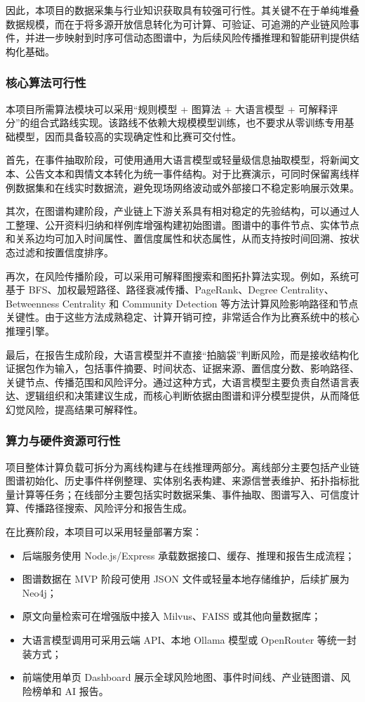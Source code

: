 \documentclass[12pt,a4paper]{article}
\begin{document}
因此，本项目的数据采集与行业知识获取具有较强可行性。其关键不在于单纯堆叠数据规模，而在于将多源开放信息转化为可计算、可验证、可追溯的产业链风险事件，并进一步映射到时序可信动态图谱中，为后续风险传播推理和智能研判提供结构化基础。

\subsubsection{核心算法可行性}

本项目所需算法模块可以采用“规则模型 + 图算法 + 大语言模型 + 可解释评分”的组合式路线实现。该路线不依赖大规模模型训练，也不要求从零训练专用基础模型，因而具备较高的实现确定性和比赛可交付性。

首先，在事件抽取阶段，可使用通用大语言模型或轻量级信息抽取模型，将新闻文本、公告文本和舆情文本转化为统一事件结构。对于比赛演示，可同时保留离线样例数据集和在线实时数据流，避免现场网络波动或外部接口不稳定影响展示效果。

其次，在图谱构建阶段，产业链上下游关系具有相对稳定的先验结构，可以通过人工整理、公开资料归纳和样例库增强构建初始图谱。图谱中的事件节点、实体节点和关系边均可加入时间属性、置信度属性和状态属性，从而支持按时间回溯、按状态过滤和按置信度排序。

再次，在风险传播阶段，可以采用可解释图搜索和图拓扑算法实现。例如，系统可基于 BFS、加权最短路径、路径衰减传播、PageRank、Degree Centrality、Betweenness Centrality 和 Community Detection 等方法计算风险影响路径和节点关键性。由于这些方法成熟稳定、计算开销可控，非常适合作为比赛系统中的核心推理引擎。

最后，在报告生成阶段，大语言模型并不直接“拍脑袋”判断风险，而是接收结构化证据包作为输入，包括事件摘要、时间状态、证据来源、置信度分数、影响路径、关键节点、传播范围和风险评分。通过这种方式，大语言模型主要负责自然语言表达、逻辑组织和决策建议生成，而核心判断依据由图谱和评分模型提供，从而降低幻觉风险，提高结果可解释性。

\subsubsection{算力与硬件资源可行性}

项目整体计算负载可拆分为离线构建与在线推理两部分。离线部分主要包括产业链图谱初始化、历史事件样例整理、实体别名表构建、来源信誉表维护、拓扑指标批量计算等任务；在线部分主要包括实时数据采集、事件抽取、图谱写入、可信度计算、传播路径搜索、风险评分和报告生成。

在比赛阶段，本项目可以采用轻量部署方案：
\begin{itemize}
    \item 后端服务使用 Node.js/Express 承载数据接口、缓存、推理和报告生成流程；
    \item 图谱数据在 MVP 阶段可使用 JSON 文件或轻量本地存储维护，后续扩展为 Neo4j；
    \item 原文向量检索可在增强版中接入 Milvus、FAISS 或其他向量数据库；
    \item 大语言模型调用可采用云端 API、本地 Ollama 模型或 OpenRouter 等统一封装方式；
    \item 前端使用单页 Dashboard 展示全球风险地图、事件时间线、产业链图谱、风险榜单和 AI 报告。
\end{itemize}
\end{document}

